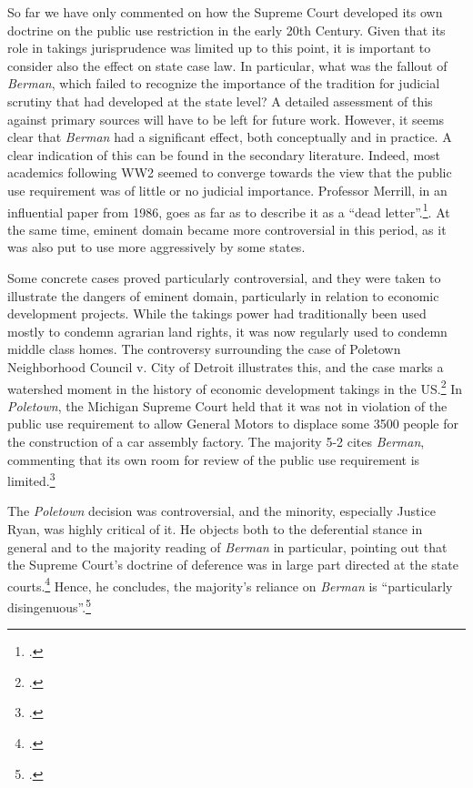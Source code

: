 So far we have only commented on how the Supreme Court developed its own doctrine on the public use restriction in the early 20th Century. Given that its role in takings jurisprudence was limited up to this point, it is important to consider also the effect on state case law. In particular, what was the fallout of {\it Berman}, which failed to recognize the importance of the tradition for judicial scrutiny that had developed at the state level? A detailed assessment of this against primary sources will have to be left for future work. However, it seems clear that {\it Berman} had a significant effect, both conceptually and in practice. A clear indication of this can be found in the secondary literature. Indeed, most academics following WW2 seemed to converge towards the view that the public use requirement was of little or no judicial importance. Professor Merrill, in an influential paper from 1986, goes as far as to describe it as a ``dead letter''.\footcite{merrill86}. At the same time, eminent domain became more controversial in this period, as it was also put to use more aggressively by some states.

 Some concrete cases proved particularly controversial, and they were taken to illustrate the dangers of eminent domain, particularly in relation to economic development projects. While the takings power had traditionally been used mostly to condemn agrarian land rights, it was now regularly used to condemn middle class homes. The controversy surrounding the case of Poletown Neighborhood Council v. City of Detroit  illustrates this, and the case marks a watershed moment in the history of  economic development takings in the US.\footcite[See][380-381]{underkuffler09} In {\it Poletown}, the Michigan Supreme Court held that it was not in violation of the public use requirement to allow General Motors to displace some 3500 people for the construction of a car assembly factory. The majority 5-2 cites {\it Berman}, commenting that its own room for review of the public use requirement is limited.\footcite[632-633]{poletown81}

The {\it Poletown} decision was controversial, and the minority, especially Justice Ryan, was highly critical of it. He objects both to the deferential stance in general and to the majority reading of {\it Berman} in particular, pointing out that the Supreme Court's doctrine of deference was in large part directed at the state courts.\footcite[668]{poletown81} Hence, he concludes, the majority's reliance on {\it Berman} is ``particularly disingenuous''.\footcite[668]{poletown81} 

